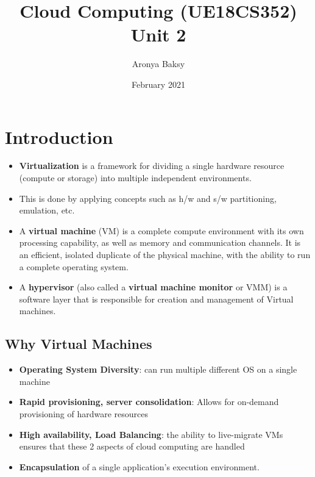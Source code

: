 \documentclass{article}
\title{Cloud Computing (UE18CS352) \\Unit 2}
\author{Aronya Baksy}
\date{February 2021}
\begin{document}
\maketitle

\section{Introduction}
\begin{itemize}
    \item \textbf{Virtualization} is a framework for dividing a single hardware resource (compute or storage) into multiple independent environments.
    
    \item This is done by applying concepts such as h/w and s/w partitioning, emulation, etc. 
    
    \item A \textbf{virtual machine} (VM) is a complete compute environment with its own processing capability, as well as memory and communication channels. It is an efficient, isolated duplicate of the physical machine, with the ability to run a complete operating system. 
    
    \item A \textbf{hypervisor} (also called a \textbf{virtual machine monitor} or VMM) is a software layer that is responsible for creation and management of Virtual machines. 
\end{itemize}

\subsection{Why Virtual Machines}
\begin{itemize}
    \item \textbf{Operating System Diversity}: can run multiple different OS on a single machine 
    
    \item \textbf{Rapid provisioning, server consolidation}: Allows for on-demand provisioning of hardware resources
    
    \item \textbf{High availability, Load Balancing}: the ability to live-migrate VMs ensures that these 2 aspects of cloud computing are handled
    
    \item \textbf{Encapsulation} of a single application's execution environment. 
\end{itemize}
\end{document}
